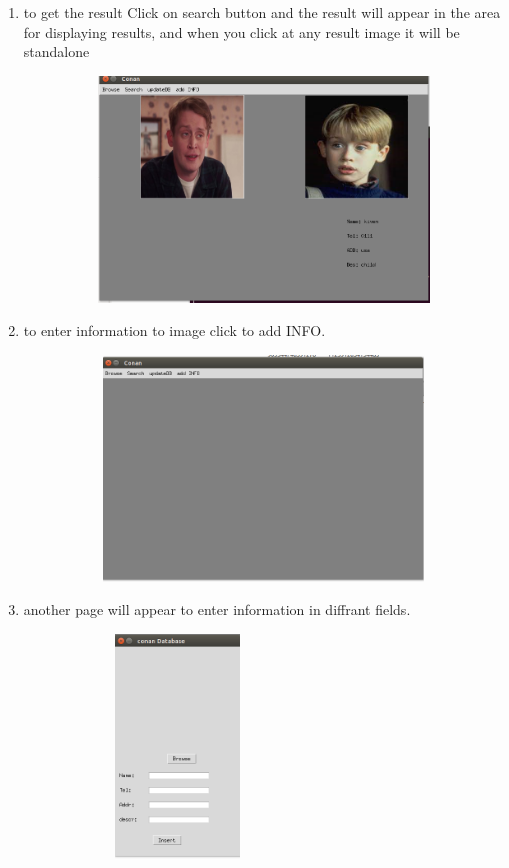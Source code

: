 \documentclass[pdftex,10pt,a4paper,oneside]{article}
\begin{document}
\begin{enumerate}
\pagebreak
		\item 	to get the result Click on search button and the result will appear in the area for displaying results, and when you click at any result image it will be  standalone
		\begin{figure}[H]
		\centering
		\includegraphics[width=120mm,height=60mm]{fig/05.png}
	\end{figure}


	
	\item to enter information to image click to add INFO.
		
		 	\begin{figure}[H]
		 	\centering
		 	\includegraphics[width=120mm,height=60mm]{fig/06.png}
		 \end{figure}
	
	
	\pagebreak
		\item 	another page will appear to enter information in diffrant fields.
			\begin{figure}[H]
			\centering
			\includegraphics[width=60mm,height=60mm]{fig/7.png}
		\end{figure}
	

\end{enumerate}
\end{document}
